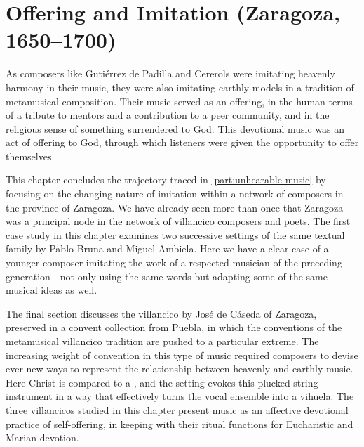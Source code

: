 


\chapter{Offering and Imitation (Zaragoza, 1650--1700)}
\label{ch:zaragoza}

As composers like Gutiérrez de Padilla and Cererols were imitating heavenly
harmony in their music, they were also imitating earthly models in a tradition
of metamusical composition.
Their music served as an offering, in the human terms of a tribute to mentors
and a contribution to a peer community, and in the religious sense of something
surrendered to God.
This devotional music was an act of offering to God, through which listeners
were given the opportunity to offer themselves.

This chapter concludes the trajectory traced in \cref{part:unhearable-music} by
focusing on the changing nature of imitation within a network of composers in
the province of Zaragoza.
We have already seen more than once that Zaragoza was a principal node in the
network of villancico composers and poets.
The first case study in this chapter examines two successive settings of the
same textual family by Pablo Bruna and Miguel Ambiela.
Here we have a clear case of a younger composer imitating the work of a
respected musician of the preceding generation---not only using the same words
but adapting some of the same musical ideas as well.

The final section discusses the villancico  by José
de Cáseda of Zaragoza, preserved in a convent collection from Puebla, in which
the conventions of the metamusical villancico tradition are pushed to a
particular extreme.
The increasing weight of convention in this type of music required composers to
devise ever-new ways to represent the relationship between heavenly and earthly
music.
Here Christ is compared to a , and the setting evokes this
plucked-string instrument in a way that effectively turns the vocal ensemble
into a vihuela.
The three villancicos studied in this chapter present music as an affective
devotional practice of self-offering, in keeping with their ritual functions
for Eucharistic and Marian devotion.

